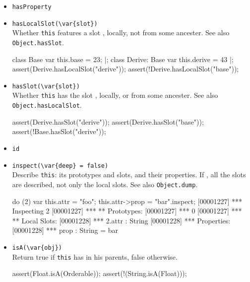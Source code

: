 \begin{itemize}
\item \lstinline|hasProperty|\\

\item \lstinline|hasLocalSlot(\var{slot})|\\
  Whether \lstinline|this| features a slot , locally, not
  from some ancester.  See also \lstinline|Object.hasSlot|.

\begin{urbiscript}[firstnumber=last]
class Base         { var this.base = 23; } |;
class Derive: Base { var this.derive = 43 } |;
assert(Derive.hasLocalSlot("derive"));
assert(!Derive.hasLocalSlot("base"));
\end{urbiscript}

\item \lstinline|hasSlot(\var{slot})|\\
  Whether \lstinline|this| has the slot , locally, or from
  some ancester.  See also \lstinline|Object.hasLocalSlot|.

\begin{urbiscript}[firstnumber=last]
assert(Derive.hasSlot("derive"));
assert(Derive.hasSlot("base"));
assert(!Base.hasSlot("derive"));
\end{urbiscript}

\item \lstinline|id|\\

\item \lstinline|inspect(\var{deep} = false)|\\
  Describe \lstinline|this|: its prototypes and slots, and their
  properties.  If , all the slots are described, not only
  the local slots. See also \lstinline|Object.dump|.
\begin{urbiscript}[firstnumber=last]
do (2) { var this.attr = "foo"; this.attr->prop = "bar"}.inspect;
[00001227] *** Inspecting 2
[00001227] *** ** Prototypes:
[00001227] ***   0
[00001227] *** ** Local Slots:
[00001228] ***   2.attr : String
[00001228] ***     Properties:
[00001228] ***      prop : String = bar
\end{urbiscript}

\item \lstinline|isA(\var{obj})|\\
  Return true if \lstinline|this| has  in his parents, false
  otherwise.

\begin{urbiscript}[firstnumber=last]
assert(Float.isA(Orderable));
assert(!(String.isA(Float)));
\end{urbiscript}


\end{itemize}
